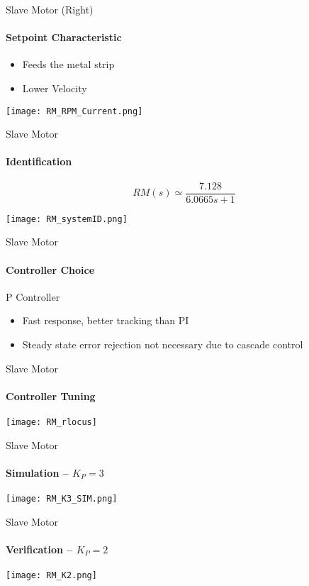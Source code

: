 \begin{frame}{Slave Motor (Right)}
	\framesubtitle{Setpoint Characteristic}
  \begin{itemize}
		\item Feeds the metal strip
		\item Lower Velocity
	\end{itemize}

		\centering
			\texttt{[image: RM\_RPM\_Current.png]}
	\end{frame}

\begin{frame}{Slave Motor}
  \framesubtitle{Identification}


\begin{equation}
	RM(s) \simeq \frac{7.128}{6.0665s+1}
\end{equation}



			\centering
				\texttt{[image: RM\_systemID.png]}


\end{frame}

\begin{frame}{Slave Motor}
  \framesubtitle{Controller Choice}
  \begin{block}{P Controller}
	\begin{itemize}
		\item Fast response, better tracking than PI
		\item Steady state error rejection not necessary due to cascade control
	\end{itemize}
  \end{block}
\end{frame}


	\begin{frame}{Slave Motor}
  \framesubtitle{Controller Tuning}

		\centering
			\texttt{[image: RM\_rlocus]}



	\end{frame}


\begin{frame}{Slave Motor}
\framesubtitle{Simulation -- $K_P = 3$}
\centering
\texttt{[image: RM\_K3\_SIM.png]}
\end{frame}



\begin{frame}{Slave Motor}
\framesubtitle{Verification -- $K_P = 2$ }
\centering
\texttt{[image: RM\_K2.png]}
\end{frame}


